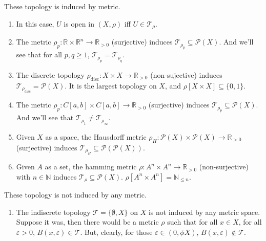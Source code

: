 \begin{note}
	These topology is induced by metric.
	\begin{enumerate}
		\item In this case, $U$ is open in $(X, \rho)$ iff $U \in \mathcal T_\rho$.
		
		\item The metric $\rho_p :\mathbb R \times \mathbb R^n \to \mathbb R_{> 0}$ (surjective) induces $\mathcal T_{\rho_p} \subseteq \mathcal P(X)$. And we'll see that for all $p, q \ge 1$, $\mathcal T_{\rho_p} = \mathcal T_{\rho_q}$.
		
		\item The discrete topology $\rho_\mathrm{disc} : X \times X \to \mathbb R_{> 0}$ (non-sujective) induces $\mathcal T_{\rho_\mathrm{disc}} = \mathcal P(X)$. It is the largest topology on $X$, and $\rho[X \times X] \subseteq \{0,1\}$.
		
		\item The metric $\rho_p: C[a,b] \times C[a,b] \to \mathbb R_{>0}$ (surjective) induces $\mathcal T_{\rho_p} \subseteq \mathcal P(X)$. And we'll see that $\mathcal T_{\rho_1} \ne \mathcal {T}_{\rho_\infty}$.
		
		\item Given $X$ as a space, the Hausdorff metric $\rho_H: \mathcal P(X) \times \mathcal P(X) \to \mathbb R_{>0}$ (surjective) induces $\mathcal T_{\rho_H} \subseteq \mathcal P(\mathcal P(X))$.
		
		\item Given $A$ as a set, the hamming metric $\rho: A^n \times A^n \to \mathbb R_{> 0}$ (non-surjective) with $n \in \mathbb N$ induces $\mathcal T_\rho \subseteq \mathcal P(X)$. $\rho[A^n \times A^n] = \mathbb N_{\le n}$.
	\end{enumerate}
	
	These topology is not induced by any metric.
	\begin{enumerate}
		\item The indiscrete topology $\mathcal T = \{\emptyset, X\}$ on $X$ is not induced by any metric space. Suppose it was, then there would be a metric $\rho$ such that for all $x \in X$, for all $\varepsilon > 0$, $B(x, \varepsilon) \in \mathcal T$. But, clearly, for those $\varepsilon \in (0, \phi X)$, $B(x, \varepsilon) \notin \mathcal T$.
		

\end{enumerate}
\end{note}
